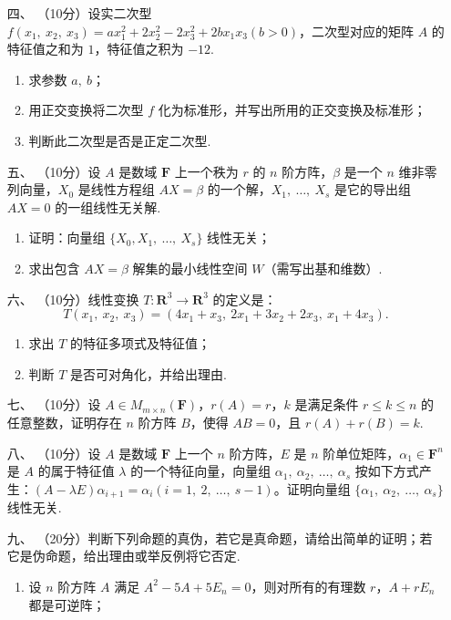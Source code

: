 \begin{enumerate}
\begin{enumerate}[label=(\arabic*)]
    \end{enumerate}
	\item[四、]（10分）设实二次型 $f(x_1,\ x_2,\ x_3)=ax_1^2+2x_2^2-2x_3^2+2bx_1x_3(b > 0)$，二次型对应的矩阵 $A$ 的特征值之和为 $1$，特征值之积为 $-12$.
    \begin{enumerate}[label=(\arabic*)]
        \item 求参数 $a,\ b$；
        \item 用正交变换将二次型 $f$ 化为标准形，并写出所用的正交变换及标准形；
        \item 判断此二次型是否是正定二次型.
    \end{enumerate}
	\item[五、]（10分）设 $A$ 是数域 $\mathbf{F}$ 上一个秩为 $r$ 的 $n$ 阶方阵，$\beta$ 是一个 $n$ 维非零列向量，$X_0$ 是线性方程组 $AX=\beta$ 的一个解，$X_1,\ \dots,\ X_s$ 是它的导出组 $AX=0$ 的一组线性无关解.
    \begin{enumerate}
        \item 证明：向量组 $\{X_0, X_1,\ \dots,\ X_s\}$ 线性无关；
        \item 求出包含 $AX=\beta$ 解集的最小线性空间 $W$（需写出基和维数）.
    \end{enumerate}
	\item[六、]（10分）线性变换 $T : \mathbf{R}^3 \to \mathbf{R}^3$ 的定义是：
    \[T(x_1,\ x_2,\ x_3)=(4x_1+x_3,\ 2x_1+3x_2+2x_3,\ x_1+4x_3).\]
    \begin{enumerate}[label=(\arabic*)]
        \item 求出 $T$ 的特征多项式及特征值；
        \item 判断 $T$ 是否可对角化，并给出理由.
    \end{enumerate}
	\item[七、]（10分）设 $A \in M_{m \times n}(\mathbf{F})$，$r(A)=r$，$k$ 是满足条件 $r \leq k \leq n$ 的任意整数，证明存在 $n$ 阶方阵 $B$，使得 $AB=0$，且 $r(A)+r(B)=k$.
    \item[八、]（10分）设 $A$ 是数域 $\mathbf{F}$ 上一个 $n$ 阶方阵，$E$ 是 $n$ 阶单位矩阵，$\alpha_1 \in \mathbf{F}^n$ 是 $A$ 的属于特征值 $\lambda$ 的一个特征向量，向量组 $\alpha_1,\ \alpha_2,\ \dots,\ \alpha_s$ 按如下方式产生：$(A-\lambda E)\alpha_{i+1}=\alpha_i(i=1,\ 2,\ \dots,\ s-1)$。证明向量组 $\{\alpha_1,\ \alpha_2,\ \dots,\ \alpha_s\}$ 线性无关.
	\item[九、]（20分）判断下列命题的真伪，若它是真命题，请给出简单的证明；若它是伪命题，给出理由或举反例将它否定.
    \begin{enumerate}[label=(\arabic*)]
        \item 设 $n$ 阶方阵 $A$ 满足 $A^2-5A+5E_n=0$，则对所有的有理数 $r$，$A+rE_n$ 都是可逆阵；

\end{enumerate}
\end{enumerate}
